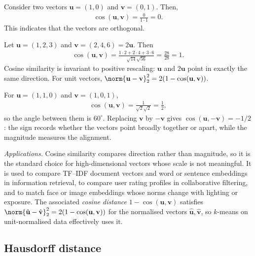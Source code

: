 \documentclass[a4paper, 12pt]{book}
\begin{document}
\begin{example}
    Consider two vectors $\mathbf{u}=(1,0)$ and $\mathbf{v}=(0,1)$. Then,
    \begin{align}
        \cos(\mathbf{u},\mathbf{v}) = \frac{0}{1 \cdot 1} = 0.
    \end{align}
    This indicates that the vectors are orthogonal.
\end{example}

\begin{example}
    Let $\mathbf{u}=(1,2,3)$ and $\mathbf{v}=(2,4,6)=2\mathbf{u}$. Then
    \begin{align}
        \cos(\mathbf{u},\mathbf{v})
        = \frac{1\cdot2+2\cdot4+3\cdot6}{\sqrt{14}\sqrt{56}}
        = \frac{28}{28} = 1.
    \end{align}
    Cosine similarity is invariant to positive rescaling: $\mathbf{u}$ and
    $2\mathbf{u}$ point in exactly the same direction. For unit vectors,
    $\norm{\mathbf{u}-\mathbf{v}}_2^2=2(1-\cos(\mathbf{u},\mathbf{v}))$.
\end{example}

\begin{example}
    For $\mathbf{u}=(1,1,0)$ and $\mathbf{v}=(1,0,1)$,
    \begin{align}
        \cos(\mathbf{u},\mathbf{v})=\frac{1}{\sqrt2\sqrt2}=\frac12,
    \end{align}
    so the angle between them is $60^\circ$. Replacing $\mathbf{v}$ by
    $-\mathbf{v}$ gives $\cos(\mathbf{u},-\mathbf{v})=-1/2$: the sign records
    whether the vectors point broadly together or apart, while the magnitude
    measures the alignment.
\end{example}

\emph{Applications.} Cosine similarity compares direction rather than magnitude, so it is the standard choice for high-dimensional vectors whose scale is not meaningful. It is used to compare TF--IDF document vectors and word or sentence embeddings in information retrieval, to compare user rating profiles in collaborative filtering, and to match face or image embeddings whose norms change with lighting or exposure. The associated \emph{cosine distance} $1-\cos(\mathbf{u},\mathbf{v})$ satisfies $\norm{\hat{\mathbf{u}}-\hat{\mathbf{v}}}_2^2=2(1-\cos(\mathbf{u},\mathbf{v}))$ for the normalised vectors $\hat{\mathbf{u}},\hat{\mathbf{v}}$, so $k$-means on unit-normalised data effectively uses it.

\subsection{Hausdorff distance}
\end{document}
